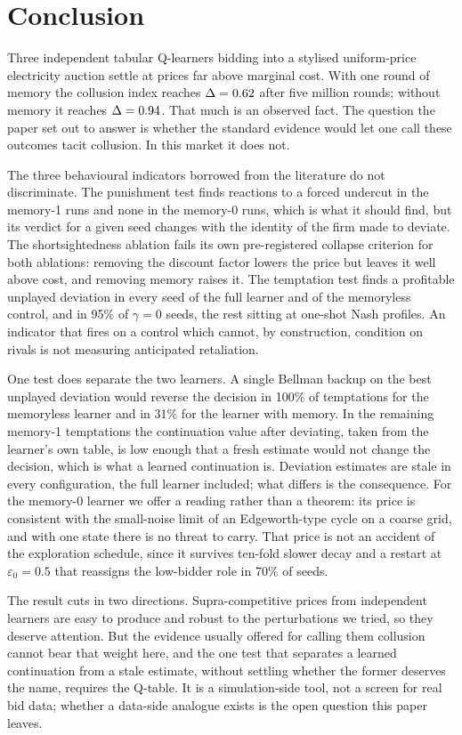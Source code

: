 \section{Conclusion}\label{sec:conclusion}

Three independent tabular Q-learners bidding into a stylised uniform-price electricity auction settle at prices far above marginal cost. With one round of memory the collusion index reaches $\Delta = 0.62$ after five million rounds; without memory it reaches $\Delta = 0.94$. That much is an observed fact. The question the paper set out to answer is whether the standard evidence would let one call these outcomes tacit collusion. In this market it does not.

The three behavioural indicators borrowed from the literature do not discriminate. The punishment test finds reactions to a forced undercut in the memory-1 runs and none in the memory-0 runs, which is what it should find, but its verdict for a given seed changes with the identity of the firm made to deviate. The shortsightedness ablation fails its own pre-registered collapse criterion for both ablations: removing the discount factor lowers the price but leaves it well above cost, and removing memory raises it. The temptation test finds a profitable unplayed deviation in every seed of the full learner and of the memoryless control, and in 95\% of $\gamma = 0$ seeds, the rest sitting at one-shot Nash profiles. An indicator that fires on a control which cannot, by construction, condition on rivals is not measuring anticipated retaliation.

One test does separate the two learners. A single Bellman backup on the best unplayed deviation would reverse the decision in 100\% of temptations for the memoryless learner and in 31\% for the learner with memory. In the remaining memory-1 temptations the continuation value after deviating, taken from the learner's own table, is low enough that a fresh estimate would not change the decision, which is what a learned continuation is. Deviation estimates are stale in every configuration, the full learner included; what differs is the consequence. For the memory-0 learner we offer a reading rather than a theorem: its price is consistent with the small-noise limit of an Edgeworth-type cycle on a coarse grid, and with one state there is no threat to carry. That price is not an accident of the exploration schedule, since it survives ten-fold slower decay and a restart at $\varepsilon_0 = 0.5$ that reassigns the low-bidder role in 70\% of seeds.

The result cuts in two directions. Supra-competitive prices from independent learners are easy to produce and robust to the perturbations we tried, so they deserve attention. But the evidence usually offered for calling them collusion cannot bear that weight here, and the one test that separates a learned continuation from a stale estimate, without settling whether the former deserves the name, requires the Q-table. It is a simulation-side tool, not a screen for real bid data; whether a data-side analogue exists is the open question this paper leaves.
